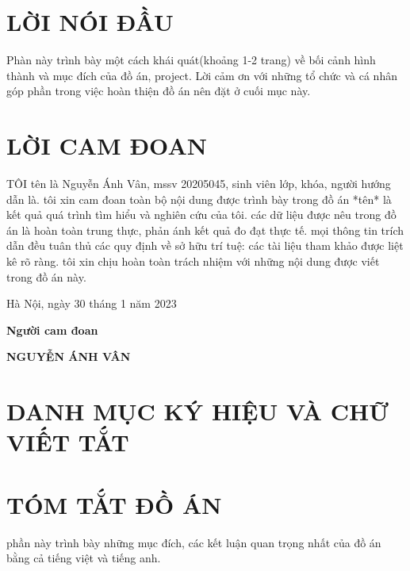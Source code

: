 \documentclass{article}
\begin{document}
\section*{LỜI NÓI ĐẦU} %
\thispagestyle{empty}
Phàn này trình bày một cách khái quát(khoảng 1-2 trang) về bối cảnh hình thành và mục đích của đồ án, project. Lời cảm ơn với những tổ chức và cá nhân góp phần trong việc hoàn thiện đồ án nên đặt ở cuối mục này.

\cleardoublepage
\section*{LỜI CAM ĐOAN} %
\thispagestyle{empty}
TÔI tên là Nguyễn Ánh Vân, mssv 20205045, sinh viên lớp, khóa, người hướng dẫn là. tôi xin cam đoan toàn bộ nội dung được trình bày trong đồ án *tên* là kết quả quá trình tìm hiểu và nghiên cứu của tôi. các dữ liệu được nêu trong đồ án là hoàn toàn trung thực, phản ánh kết quả đo đạt thực tế. mọi thông tin trích dẫn đều tuân thủ các quy định về sở hữu trí tuệ: các tài liệu tham khảo được liệt kê rõ ràng. tôi xin chịu hoàn toàn trách nhiệm với những nội dung được viết trong đồ án này.

\vspace{6pt}
\hspace{7cm}
Hà Nội, ngày 30 tháng 1 năm 2023

\hspace{9cm}\textbf{Người cam đoan} 
\vspace{2cm}

\hspace{8.65cm} \textbf{NGUYỄN ÁNH VÂN}
\cleardoublepage

\tableofcontents %
\thispagestyle{empty}
\cleardoublepage

\section*{DANH MỤC KÝ HIỆU VÀ CHỮ VIẾT TẮT}
{}
\cleardoublepage

{
\let\oldnumberline\numberline
\renewcommand{\numberline}{\figurename~\oldnumberline}
\listoffigures} %
{}
\cleardoublepage

{
\let\oldnumberline\numberline
\renewcommand{\numberline}{\tablename~\oldnumberline}
\listoftables}
\cleardoublepage

\section*{TÓM TẮT ĐỒ ÁN}
{}
phần này trình bày những mục đích, các kết luận quan trọng nhất của đồ án bằng cả tiếng việt và tiếng anh.
\cleardoublepage
\end{document}
